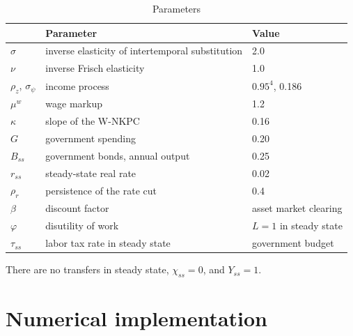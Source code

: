 \begin{table}[h]
\centering
\caption{Parameters}
\small
\begin{tabularx}{\textwidth}{lXl}
\toprule
 & Parameter & Value \\
\midrule
$\sigma$ & inverse elasticity of intertemporal substitution & 2.0 \\
$\nu$ & inverse Frisch elasticity & 1.0 \\
$\rho_z$, $\sigma_\psi$ & income process & $0.95^{4}$, 0.186 \\
$\mu^{w}$ & wage markup & 1.2 \\
$\kappa$ & slope of the W-NKPC & 0.16 \\
$G$ & government spending & 0.20 \\
$B_{ss}$ & government bonds, annual output & 0.25 \\
$r_{ss}$ & steady-state real rate & 0.02 \\
$\rho_r$ & persistence of the rate cut & 0.4 \\
$\beta$ & discount factor & asset market clearing \\
$\varphi$ & disutility of work & $L=1$ in steady state \\
$\tau_{ss}$ & labor tax rate in steady state & government budget \\
\bottomrule
\end{tabularx}
\end{table}

There are no transfers in steady state, $\chi_{ss}=0$, and $Y_{ss}=1$.

\section{Numerical implementation}


